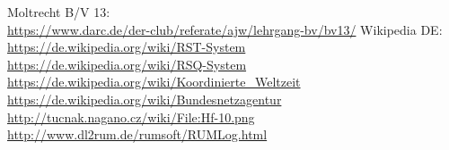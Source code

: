 \begin{thebibliography}{}

   Moltrecht B/V 13: \\
    \url{https://www.darc.de/der-club/referate/ajw/lehrgang-bv/bv13/}
      Wikipedia DE: \\
    \url{https://de.wikipedia.org/wiki/RST-System}\\
    \url{https://de.wikipedia.org/wiki/RSQ-System}\\
    \url{https://de.wikipedia.org/wiki/Koordinierte_Weltzeit}\\
    \url{https://de.wikipedia.org/wiki/Bundesnetzagentur}\\
    \url{http://tucnak.nagano.cz/wiki/File:Hf-10.png}\\
   \url{http://www.dl2rum.de/rumsoft/RUMLog.html}\\
\end{thebibliography}


